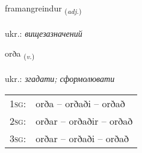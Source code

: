 \documentclass[frontgrid, backgrid]{flacards}\usepackage[]{graphicx}\usepackage[]{xcolor}
\begin{document}
\renewcommand{\flhead}{\vskip5pt \fboxsep=0pt {\small\bfseries\footnotesize Lýsingarorð | прикметник}}
\renewcommand{\fcfoot}{\vskip5pt \fboxsep=0pt \hspace{2pt}{\small\bfseries\footnotesize 2K}}

\renewcommand{\blhead}{\vskip5pt {\small\bfseries\footnotesize Lýsingarorð | прикметник }}
\renewcommand{\bcfoot}{\vskip5pt \hspace{2pt}{\small\bfseries\footnotesize 2K}}


{framangreindur \small{\textsubscript{(\textit{adj.})}} \\[1ex] %
\textphonetic{[fraːmankreintʏr]} \\
ukr.: \emph{вищезазначений} \\  [2ex]
\renewcommand*{\arraystretch}{0.8}
}

\renewcommand{\flhead}{\vskip5pt \fboxsep=0pt {\small\bfseries\footnotesize Sagnorð | дієслово}}
\renewcommand{\fcfoot}{\vskip5pt \fboxsep=0pt \hspace{2pt}{\small\bfseries\footnotesize 2K}}

\renewcommand{\blhead}{\vskip5pt {\small\bfseries\footnotesize Sagnorð | дієслово }}
\renewcommand{\bcfoot}{\vskip5pt \hspace{2pt}{\small\bfseries\footnotesize 2K}}


{orða \small{\textsubscript{(\textit{v.})}} \\[1ex] %
\textphonetic{[ɔrða]} \\
ukr.: \emph{згадати; сформолювати} \\  [2ex]
\renewcommand*{\arraystretch}{0.8}
\begin{tabular}{p{1cm}l}
\textsc{1sg}: & orða -- orðaði -- orðað \\ 
\textsc{2sg}: & orðar -- orðaðir -- orðað \\ 
\textsc{3sg}: & orðar -- orðaði -- orðað \\ 
\end{tabular}
}
\end{document}
